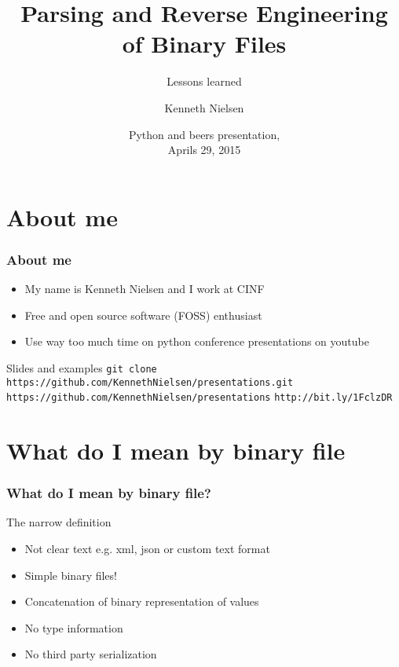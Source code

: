 \documentclass{beamer}
\title{Parsing and Reverse Engineering of Binary Files}
\subtitle{Lessons learned}
\author{Kenneth Nielsen\inst{1}}
\institute
{
  \inst{1}%
  Center for Individual Nanoparticle Functionality (CINF)\\
  Institute of Physics\\
  Technical University of Denmark (DTU)
}
\date{
  Python and beers presentation,\\
  Aprils 29, 2015}
\begin{document}
\frame{\titlepage}

\section{About me}

\begin{frame}
  \frametitle{About me}
  \begin{itemize}
    \item My name is Kenneth Nielsen and I work at CINF
    \item Free and open source software (FOSS) enthusiast
    \item Use way too much time on python conference presentations on
      youtube
  \end{itemize}
  \begin{block}{Slides and examples}
    \center
    \footnotesize
    \texttt{git clone https://github.com/KennethNielsen/presentations.git}\newline
    \newline
    \texttt{https://github.com/KennethNielsen/presentations}
    \texttt{http://bit.ly/1FclzDR}
  \end{block}
\end{frame}


\section{What do I mean by binary file}

\begin{frame}
  \frametitle{What do I mean by binary file?}
  \begin{block}{The narrow definition}
    \begin{itemize}
    \item Not clear text e.g. xml, json or custom text format
    \item Simple binary files!
    \item Concatenation of binary representation of values
    \item No type information
    \item No third party serialization
    \end{itemize}
  \end{block}
\end{frame}
\end{document}
